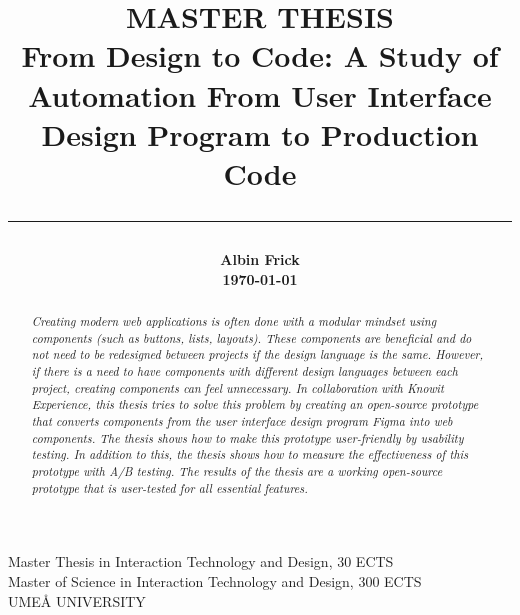 \title{
    \Large MASTER THESIS\\
    \vspace{5mm}
    \huge \bf
        From Design to Code: A Study of Automation From User Interface Design Program to Production Code\\
        \noindent\rule{\textwidth}{0.4pt}

}

\date{} %
\author{
    \LARGE\bf{Albin Frick}\\
    \today
}

\maketitle
\vspace*{\fill}
\begin{center}
Master Thesis in Interaction Technology and Design, 30 ECTS\\
Master of Science in Interaction Technology and Design, 300 ECTS\\
UMEÅ UNIVERSITY
\end{center}
\newpage
\tableofcontents
\newpage
{}
\begin{abstract}
\textit{Creating modern web applications is often done with a modular mindset using components (such as buttons, lists, layouts). These components are beneficial and do not need to be redesigned between projects if the design language is the same. However, if there is a need to have components with different design languages between each project, creating components can feel unnecessary. In collaboration with Knowit Experience, this thesis tries to solve this problem by creating an open-source prototype that converts components from the user interface design program Figma into web components. The thesis shows how to make this prototype user-friendly by usability testing. In addition to this, the thesis shows how to measure the effectiveness of this prototype with A/B testing. The results of the thesis are a working open-source prototype that is user-tested for all essential features.}
\end{abstract}
\newpage
